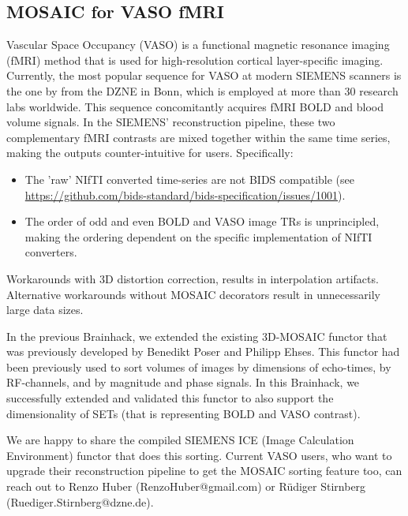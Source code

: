 \documentclass[../main.tex]{subfiles}
\begin{document}
\subsection{MOSAIC for VASO fMRI} 


Vascular Space Occupancy (VASO) is a functional magnetic resonance imaging (fMRI) method that is used for high-resolution cortical layer-specific imaging\citep{Huber2021a}. Currently, the most popular sequence for VASO at modern SIEMENS scanners is the one by \textcite{Stirnberg2021a} from the DZNE in Bonn, which is employed at more than 30 research labs worldwide. This sequence concomitantly acquires fMRI BOLD and blood volume signals. In the SIEMENS' reconstruction pipeline, these two complementary fMRI contrasts are mixed together within the same time series, making the outputs counter-intuitive for users. Specifically:

\begin{itemize}
    \item The 'raw' NIfTI converted time-series are not BIDS compatible (see \href{https://github.com/bids-standard/bids-specification/issues/1001}{https://github.com/bids-standard/bids-specification/issues/1001}).
    
    \item The order of odd and even BOLD and VASO image TRs is unprincipled, making the ordering dependent on the specific implementation of NIfTI converters.
\end{itemize}

Workarounds with 3D distortion correction, results in interpolation artifacts. Alternative workarounds without MOSAIC decorators result in unnecessarily large data sizes.

In the previous Brainhack\citep{Gau2021}, we extended the existing 3D-MOSAIC functor that was previously developed by Benedikt Poser and Philipp Ehses. This functor had been previously used to sort volumes of images by dimensions of echo-times, by RF-channels, and by magnitude and phase signals. In this Brainhack, we successfully extended and validated this functor to also support the dimensionality of SETs (that is representing BOLD and VASO contrast).

We are happy to share the compiled SIEMENS ICE (Image Calculation Environment) functor that does this sorting. Current VASO users, who want to upgrade their reconstruction pipeline to get the MOSAIC sorting feature too, can reach out to Renzo Huber (RenzoHuber@gmail.com) or R\"udiger Stirnberg (Ruediger.Stirnberg@dzne.de).
\end{document}
